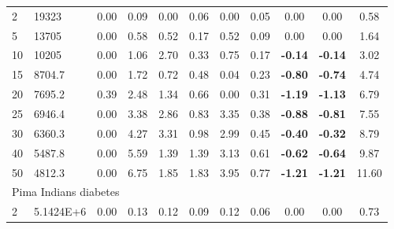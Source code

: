 {\begin{longtable}{@{}llccccccccc@{}}
\multicolumn{1}{l|}{2}  & \multicolumn{1}{l|}{19323}      & 0.00 & \multicolumn{1}{c|}{0.09}  & 0.00  & \multicolumn{1}{c|}{0.06} & 0.00  & \multicolumn{1}{c|}{0.05} & 0.00           & 0.00           & 0.58  \\
\multicolumn{1}{l|}{5}  & \multicolumn{1}{l|}{13705}      & 0.00 & \multicolumn{1}{c|}{0.58}  & 0.52  & \multicolumn{1}{c|}{0.17} & 0.52  & \multicolumn{1}{c|}{0.09} & 0.00           & 0.00           & 1.64  \\
\multicolumn{1}{l|}{10} & \multicolumn{1}{l|}{10205}      & 0.00 & \multicolumn{1}{c|}{1.06}  & 2.70  & \multicolumn{1}{c|}{0.33} & 0.75  & \multicolumn{1}{c|}{0.17} & \textbf{-0.14} & \textbf{-0.14} & 3.02  \\
\multicolumn{1}{l|}{15} & \multicolumn{1}{l|}{8704.7}     & 0.00 & \multicolumn{1}{c|}{1.72}  & 0.72  & \multicolumn{1}{c|}{0.48} & 0.04  & \multicolumn{1}{c|}{0.23} & \textbf{-0.80} & \textbf{-0.74} & 4.74  \\
\multicolumn{1}{l|}{20} & \multicolumn{1}{l|}{7695.2}     & 0.39 & \multicolumn{1}{c|}{2.48}  & 1.34  & \multicolumn{1}{c|}{0.66} & 0.00  & \multicolumn{1}{c|}{0.31} & \textbf{-1.19} & \textbf{-1.13} & 6.79  \\
\multicolumn{1}{l|}{25} & \multicolumn{1}{l|}{6946.4}     & 0.00 & \multicolumn{1}{c|}{3.38}  & 2.86  & \multicolumn{1}{c|}{0.83} & 3.35  & \multicolumn{1}{c|}{0.38} & \textbf{-0.88} & \textbf{-0.81} & 7.55  \\
\multicolumn{1}{l|}{30} & \multicolumn{1}{l|}{6360.3}     & 0.00 & \multicolumn{1}{c|}{4.27}  & 3.31  & \multicolumn{1}{c|}{0.98} & 2.99  & \multicolumn{1}{c|}{0.45} & \textbf{-0.40} & \textbf{-0.32} & 8.79  \\
\multicolumn{1}{l|}{40} & \multicolumn{1}{l|}{5487.8}     & 0.00 & \multicolumn{1}{c|}{5.59}  & 1.39  & \multicolumn{1}{c|}{1.39} & 3.13  & \multicolumn{1}{c|}{0.61} & \textbf{-0.62} & \textbf{-0.64} & 9.87  \\
\multicolumn{1}{l|}{50} & \multicolumn{1}{l|}{4812.3}     & 0.00 & \multicolumn{1}{c|}{6.75}  & 1.85  & \multicolumn{1}{c|}{1.83} & 3.95  & \multicolumn{1}{c|}{0.77} & \textbf{-1.21} & \textbf{-1.21} & 11.60 \\ \hline
\multicolumn{11}{l}{Pima Indians diabetes}                                                                                                                                                                      \\ \hline
\multicolumn{1}{l|}{2}  & \multicolumn{1}{l|}{5.1424E+6}  & 0.00 & \multicolumn{1}{c|}{0.13}  & 0.12  & \multicolumn{1}{c|}{0.09} & 0.12  & \multicolumn{1}{c|}{0.06} & 0.00           & 0.00           & 0.73  \\

\end{longtable}}
